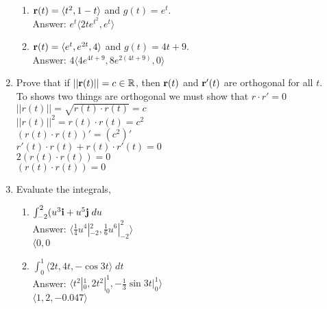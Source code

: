 \documentclass[11pt]{article}
\begin{document}
\begin{enumerate}
    \begin{enumerate}
        \item ${\bf r}(t) = \langle t^2, 1-t \rangle$ and $g(t) = e^t$.
        \\
        Answer:  $ e^t \langle 2te^{t^2},e^t \rangle  $
        
        \item ${\bf r}(t) = \langle e^t, e^{2t}, 4 \rangle$ and $g(t) = 4t+9$.
        \\
        Answer: $4 \langle 4e^{4t+9}, 8e^{2(4t+9)},0 \rangle $
        
    \end{enumerate}

    \item Prove that if $||{\bf r}(t) || = c \in  \mathbb{R}$, then ${\bf r}(t)$ and ${\bf r}'(t)$ are orthogonal for all $t$.
    \\
    To shows two things are orthogonal we must show that $r \cdot r' =0$
    \\
    $||r(t)||=\sqrt{r(t) \cdot r(t)}=c$
    \\
    $||r(t)||^2=r(t) \cdot r(t) = c^2$
    \\
    $(r(t) \cdot r(t))' = (c^2)'$
    \\
    $r'(t) \cdot r(t)+r(t) \cdot r'(t) = 0 $
    \\
    $2(r(t) \cdot r(t)) = 0$
    \\
    $(r(t) \cdot r(t)) = 0$
    
    
    
    
    
    
    \item Evaluate the integrals, 
    \begin{enumerate}
    
    
        \item $\int_{-2}^2 (u^3 {\bf i} + u^5 {\bf j} \; du$
        \\
        Answer: $\langle \frac{1}{4}u^4|_{-2}^2, \frac{1}{6}u^6|_{-2}^2 \rangle$
        \\
        $\langle 0, 0$
        
        
        
        \item $\int_{0}^1 \langle 2t, 4t, -\cos 3t \rangle \; dt$
        \\
        Answer: $\langle t^2|_0^1, 2t^2|_0^1, -\frac{1}{3}\sin 3t |_0^1 \rangle$
        \\
        $\langle 1, 2, -0.047 \rangle$
        


\end{enumerate}
\end{enumerate}
\end{document}
